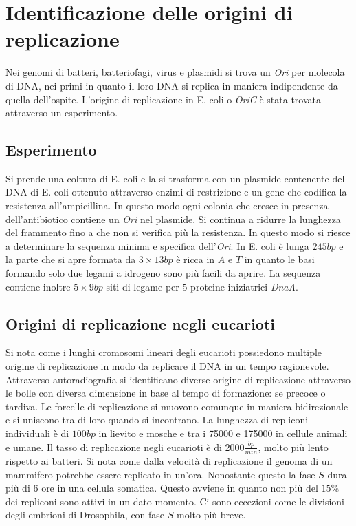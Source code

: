 \section{Identificazione delle origini di replicazione}
Nei genomi di batteri, batteriofagi, virus e plasmidi si trova un \emph{Ori} per molecola di DNA, nei primi in quanto il loro DNA si replica in maniera indipendente da quella 
dell'ospite. L'origine di replicazione in E. coli o \emph{OriC} \`e stata trovata attraverso un esperimento.
\subsection{Esperimento}
Si prende una coltura di E. coli e la si trasforma con un plasmide contenente del DNA di E. coli ottenuto attraverso enzimi di restrizione e un gene che codifica la resistenza 
all'ampicillina. In questo modo ogni colonia che cresce in presenza dell'antibiotico contiene un \emph{Ori} nel plasmide. Si continua a ridurre la lunghezza del frammento fino a che
non si verifica pi\`u la resistenza. In questo modo si riesce a determinare la sequenza minima e specifica dell'\emph{Ori}. In E. coli \`e lunga $245bp$ e la parte che si apre 
formata da $3\times 13bp$ \`e ricca in $A$ e $T$ in quanto le basi formando solo due legami a idrogeno sono pi\`u facili da aprire. La sequenza contiene inoltre $5\times 9bp$ siti di 
legame per $5$ proteine iniziatrici \emph{DnaA}.
\subsection{Origini di replicazione negli eucarioti}
Si nota come i lunghi cromosomi lineari degli eucarioti possiedono multiple origine di replicazione in modo da replicare il DNA in un tempo ragionevole. Attraverso autoradiografia si
identificano diverse origine di replicazione attraverso le bolle con diversa dimensione in base al tempo di formazione: se precoce o tardiva. Le forcelle di replicazione si muovono
comunque in maniera bidirezionale e si uniscono tra di loro quando si incontrano. La lunghezza di repliconi individuali \`e di $100bp$ in lievito e mosche e tra i \num{75000} e 
\num{175000} in cellule animali e umane. Il tasso di replicazione negli eucarioti \`e di \num{2000}$\frac{bp}{min}$, molto pi\`u lento rispetto ai batteri. Si nota come dalla velocit\`a
di replicazione il genoma di un mammifero potrebbe essere replicato in un'ora. Nonostante questo la fase $S$ dura pi\`u di $6$ ore in una cellula somatica. Questo avviene in quanto non
pi\`u del $15\%$ dei repliconi sono attivi in un dato momento. Ci sono eccezioni come le divisioni degli embrioni di Drosophila, con fase $S$ molto pi\`u breve. 
